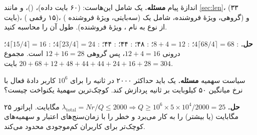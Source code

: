 \documentclass[11pt,a4paper]{article}
\begin{document}
\begin{examplebox}{اندازهٔ پیام}\label{ex:size}
\textbf{مسئله.} یک  شامل این‌هاست:  (۶۰ بایت داده)، 
()،  و  مانند \cref{sec:len}،  (۳۳ بایت)،
 ( ۱۵ رقمی)،  ( سه‌بایتی، ویژهٔ فروشنده) و
 (گروهی، ویژهٔ فروشنده، شامل یک  از نوع  به نام
، ویژهٔ فروشنده). طول آن را محاسبه کنید.

\textbf{حل.} : $4\lceil68/4\rceil = 68$؛ : $8+4 = 12$؛ : ۴۸؛
: ۴۴؛ : ۴۴؛ : $4\lceil23/4\rceil = 24$؛ :
$4\lceil15/4\rceil = 16$؛  درونی $12+4 = 16$، پس  گروهی $12+16 = 28$ است. مجموع
$20 + 68+12+48+44+44+24+16+28 = 304$ بایت.
\end{examplebox}

\begin{examplebox}{سیاست سهمیه}\label{ex:quota}
\textbf{مسئله.} یک  باید حداکثر ۲۰۰۰  در ثانیه را برای $10^6$ کاربر دادهٔ فعال با نرخ
میانگین ۵۰ کیلوبایت بر ثانیه پردازش کند. کوچک‌ترین سهمیهٔ یکنواخت چیست؟

\textbf{حل.} $\lambda_{\mathrm{total}} = N r/Q \le 2000 \Rightarrow Q \ge 10^6\times5\times10^4/2000 = 25$ مگابایت.
اپراتور ۲۵ مگابایت (یا بیشتر) را به کار می‌برد و خطر را با زمان‌سنج‌های اعتبار و سهمیه‌های کوچک‌تر برای کاربران
کم‌موجودی محدود می‌کند.
\end{examplebox}

\end{document}
